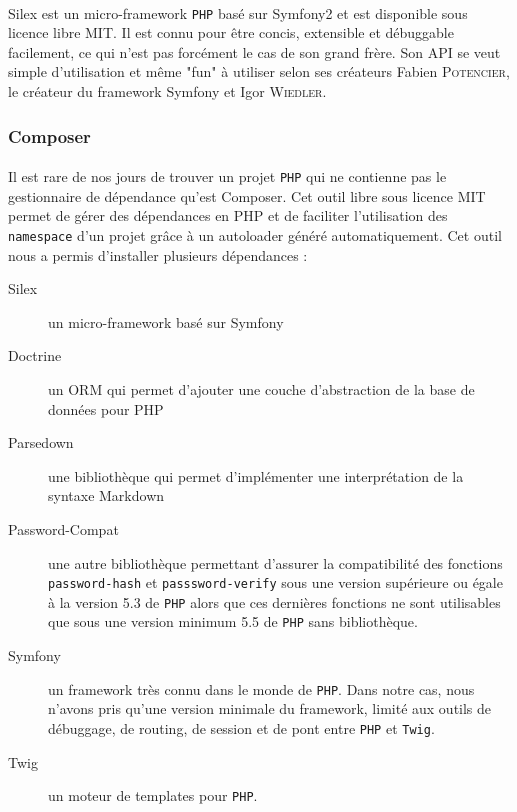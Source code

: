 \documentclass[12pt]{article}
\begin{document}
            \paragraph{} Silex est un micro-framework \texttt{PHP} basé sur Symfony2 et est disponible sous licence libre MIT. Il est connu pour être concis, extensible et débuggable facilement, ce qui n'est pas forcément le cas de son grand frère. Son API se veut simple d'utilisation et même "fun" à utiliser selon ses créateurs Fabien \textsc{Potencier}, le créateur du framework Symfony et Igor \textsc{Wiedler}.
        
        
        \subsubsection{Composer}
            \paragraph{}Il est rare de nos jours de trouver un projet \texttt{PHP} qui ne contienne pas le gestionnaire de dépendance qu'est Composer. Cet outil libre sous licence MIT permet de gérer des dépendances en PHP et de faciliter l'utilisation des \texttt{namespace} d'un projet grâce à un autoloader généré automatiquement. Cet outil nous a permis d'installer plusieurs dépendances :

            \begin{description}
                \item[Silex] un micro-framework basé sur Symfony
                \item[Doctrine] un ORM qui permet d'ajouter une couche d'abstraction de la base de données pour PHP
                \item[Parsedown] une bibliothèque qui permet d'implémenter une interprétation de la syntaxe Markdown
                \item[Password-Compat] une autre bibliothèque permettant d'assurer la compatibilité des fonctions \texttt{password-hash} et \texttt{passsword-verify} sous une version supérieure ou égale à la version 5.3 de \texttt{PHP} alors que ces dernières fonctions ne sont utilisables que sous une version minimum 5.5 de \texttt{PHP} sans bibliothèque.
                \item[Symfony] un framework très connu dans le monde de \texttt{PHP}. Dans notre cas, nous n'avons pris qu'une version minimale du framework, limité aux outils de débuggage, de routing, de session et de pont entre \texttt{PHP} et \texttt{Twig}.
                \item[Twig] un moteur de templates pour \texttt{PHP}.
            \end{description}
        
\end{document}
